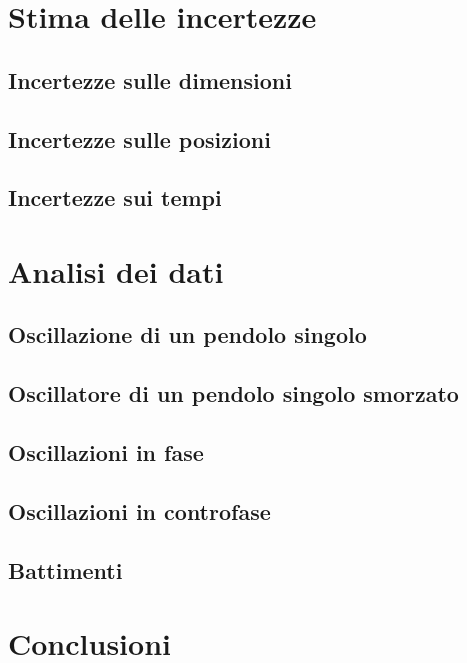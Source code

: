 \documentclass{article}
\begin{document}
\section{Stima delle incertezze}
		
		\subsection{Incertezze sulle dimensioni}
		\subsection{Incertezze sulle posizioni}
		\subsection{Incertezze sui tempi}

    
\section{Analisi dei dati}

		\subsection{ Oscillazione di un pendolo singolo}
		\subsection{  Oscillatore di un pendolo singolo smorzato }
		\subsection{  Oscillazioni in fase}
		\subsection{  Oscillazioni in controfase}
		\subsection{  Battimenti}


\section{Conclusioni}
\end{document}
